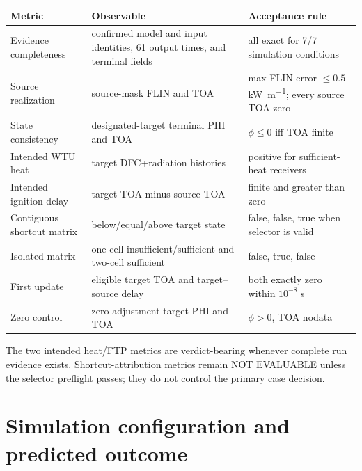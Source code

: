 \begin{center}

\begin{longtable}{@{}P{0.25\textwidth}P{0.35\textwidth}P{0.30\textwidth}@{}}\toprule
Metric & Observable & Acceptance rule\\\midrule
Evidence completeness & confirmed model and input identities, 61 output times, and terminal fields & all exact for 7/7 simulation conditions\\
Source realization & source-mask FLIN and TOA & max FLIN error \(\le0.5\) \si{\kilo\watt\per\metre}; every source TOA zero\\
State consistency & designated-target terminal PHI and TOA & \(\phi\le0\) iff TOA finite\\
Intended WTU heat & target DFC+radiation histories & positive for sufficient-heat receivers\\
Intended ignition delay & target TOA minus source TOA & finite and greater than zero\\
Contiguous shortcut matrix & below/equal/above target state & false, false, true when selector is valid\\
Isolated matrix & one-cell insufficient/sufficient and two-cell sufficient & false, true, false\\
First update & eligible target TOA and target--source delay & both exactly zero within \(10^{-8}\) s\\
Zero control & zero-adjustment target PHI and TOA & \(\phi>0\), TOA nodata\\
\bottomrule\end{longtable}
\end{center}

The two intended heat/FTP metrics are verdict-bearing whenever complete run
evidence exists. Shortcut-attribution metrics remain NOT EVALUABLE unless the
selector preflight passes; they do not control the primary case decision.

\section{Simulation configuration and predicted outcome}

